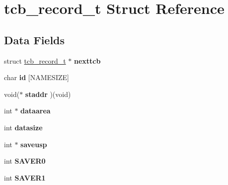\hypertarget{structtcb__record__t}{}\section{tcb\+\_\+record\+\_\+t Struct Reference}
\label{structtcb__record__t}
\subsection*{Data Fields}
\begin{DoxyCompactItemize}
\item 
\mbox{\label{structtcb__record__t_ae06d9d7114dee6671feaa0042f8edd2c}} 
struct \mbox{\hyperlink{structtcb__record__t}{tcb\+\_\+record\+\_\+t}} $\ast$ {\bfseries nexttcb}
\item 
\mbox{\label{structtcb__record__t_a42462d775784db1db19783b58c1d2c63}} 
char {\bfseries id} \mbox{[}N\+A\+M\+E\+S\+I\+ZE\mbox{]}
\item 
\mbox{\label{structtcb__record__t_a0bd4589e0b8513e1de0a399b78d68f87}} 
void($\ast$ {\bfseries staddr} )(void)
\item 
\mbox{\label{structtcb__record__t_ac4967b1b1e7ad970a0f020b0d1ee6356}} 
int $\ast$ {\bfseries dataarea}
\item 
\mbox{\label{structtcb__record__t_a5c7949e884a8b9b3d1ab9f070267bf33}} 
int {\bfseries datasize}
\item 
\mbox{\label{structtcb__record__t_a2f3abb0a3bc5b95a1f3a186b39df8563}} 
int $\ast$ {\bfseries saveusp}
\item 
\mbox{\label{structtcb__record__t_a5cc0b58f21674c6f2360277fda7110db}} 
int {\bfseries S\+A\+V\+E\+R0}
\item 
\mbox{\label{structtcb__record__t_a82b96d60fcbfbacab45247b8be146e63}} 
int {\bfseries S\+A\+V\+E\+R1}
\item 
\mbox{\label{structtcb__record__t_aaec8acf0045579c29a846ad6691ac5ca}} 

\end{DoxyCompactItemize}
